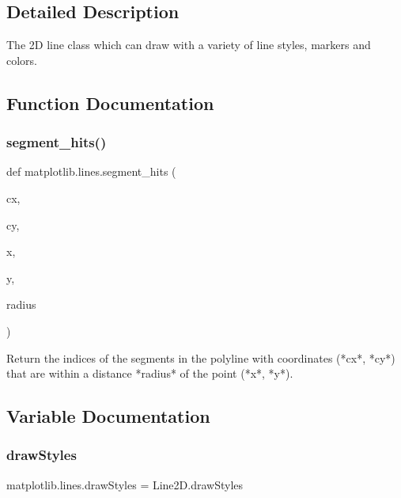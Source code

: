 \subsection{Detailed Description}
\begin{DoxyVerb}The 2D line class which can draw with a variety of line styles, markers and
colors.
\end{DoxyVerb}
 

\subsection{Function Documentation}
\mbox{\label{namespacematplotlib_1_1lines_ad86bcef38ede8b80544d1c22c138a672}} 
\subsubsection{\texorpdfstring{segment\+\_\+hits()}{segment\_hits()}}
{\footnotesize\ttfamily def matplotlib.\+lines.\+segment\+\_\+hits (\begin{DoxyParamCaption}\item[{}]{cx,  }\item[{}]{cy,  }\item[{}]{x,  }\item[{}]{y,  }\item[{}]{radius }\end{DoxyParamCaption})}

\begin{DoxyVerb}Return the indices of the segments in the polyline with coordinates (*cx*,
*cy*) that are within a distance *radius* of the point (*x*, *y*).
\end{DoxyVerb}
 

\subsection{Variable Documentation}
\mbox{\label{namespacematplotlib_1_1lines_a283b190204417ecb18408db460222965}} 
\subsubsection{\texorpdfstring{draw\+Styles}{drawStyles}}
{\footnotesize\ttfamily matplotlib.\+lines.\+draw\+Styles = Line2\+D.\+draw\+Styles}

